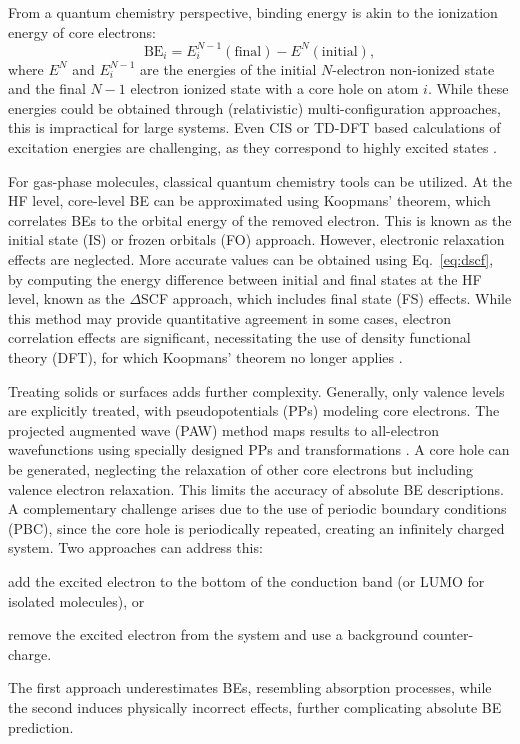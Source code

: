 \documentclass[journal=jpccck,manuscript=article]{achemso}
\begin{document}
From a quantum chemistry perspective, binding energy is akin to the ionization energy of core electrons:
\begin{equation}
	\text{BE}_i = E^{N-1}_i(\text{final}) - E^{N}(\text{initial}), \label{eq:dscf}
\end{equation}
where $E^{N}$ and $E^{N-1}_i$ are the energies of the initial $N$-electron non-ionized state and the final $N-1$ electron ionized state with a core hole on atom $i$. While these energies could be obtained through (relativistic) multi-configuration approaches, this is impractical for large systems. Even CIS or TD-DFT based calculations of excitation energies are challenging, as they correspond to highly excited states \cite{vinesPredictionCoreLevel2018}.

For gas-phase molecules, classical quantum chemistry tools can be utilized. At the HF level, core-level BE can be approximated using Koopmans' theorem, which correlates BEs to the orbital energy of the removed electron. This is known as the initial state (IS) or frozen orbitals (FO) approach. However, electronic relaxation effects are neglected. More accurate values can be obtained using Eq.~\eqref{eq:dscf}, by computing the energy difference between initial and final states at the HF level, known as the $\Delta$SCF approach, which includes final state (FS) effects. While this method may provide quantitative agreement in some cases, electron correlation effects are significant, necessitating the use of density functional theory (DFT), for which Koopmans' theorem no longer applies \cite{pueyobellafontPredictionCoreLevel2015,pueyobellafontPredictingCoreLevel2017}.

Treating solids or surfaces adds further complexity. Generally, only valence levels are explicitly treated, with pseudopotentials (PPs) modeling core electrons. The projected augmented wave (PAW) method maps results to all-electron wavefunctions using specially designed PPs and transformations \cite{blochlProjectorAugmentedwaveMethod1994}. A core hole can be generated, neglecting the relaxation of other core electrons but including valence electron relaxation. This limits the accuracy of absolute BE descriptions.
A complementary challenge arises due to the use of periodic boundary conditions (PBC), since the core hole is periodically repeated, creating an infinitely charged system. Two approaches can address this: 
\begin{inparaenum}[(i)]
	\item add the excited electron to the bottom of the conduction band (or LUMO for isolated molecules), or 
	\item remove the excited electron from the system and use a background counter-charge.
\end{inparaenum}
The first approach underestimates BEs, resembling absorption processes, while the second induces physically incorrect effects, further complicating absolute BE prediction.\cite{olovssonCorelevelShiftsComplex2006}
\end{document}
